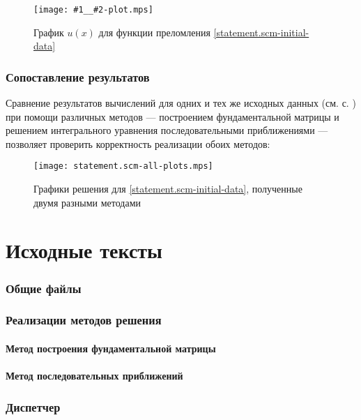 \documentclass{article}
\newcommand{\includeplot}[2]{\begin{figure}[hb]
    \centering
    \texttt{[image: \#1\_\_\#2-plot.mps]}
    \caption{График $u(x)$ для функции преломления \eqref{#2-initial-data}}
\end{figure}}
\numberwithin{equation}{section}
\begin{document}


\includeplot{iterative}{statement.scm}

\clearpage
\section{Сопоставление результатов}

Сравнение результатов вычислений для одних и тех же исходных данных
(см. с. \pageref{statement.scm-initial-data}) при помощи различных
методов — построением фундаментальной матрицы и решением интегрального
уравнения последовательными приближениями — позволяет проверить
корректность реализации обоих методов:

\begin{figure}[hb]
  \centering
  \texttt{[image: statement.scm-all-plots.mps]}
  \caption{Графики решения для \eqref{statement.scm-initial-data},
    полученные двумя разными методами}
\end{figure}

\clearpage
\appendix
\part{Исходные тексты}
\section{Общие файлы}




\clearpage
\section{Реализации методов решения}
\subsection{Метод построения  фундаментальной матрицы}



\clearpage
\subsection{Метод последовательных приближений}



\clearpage
\section{Диспетчер}
\end{document}
